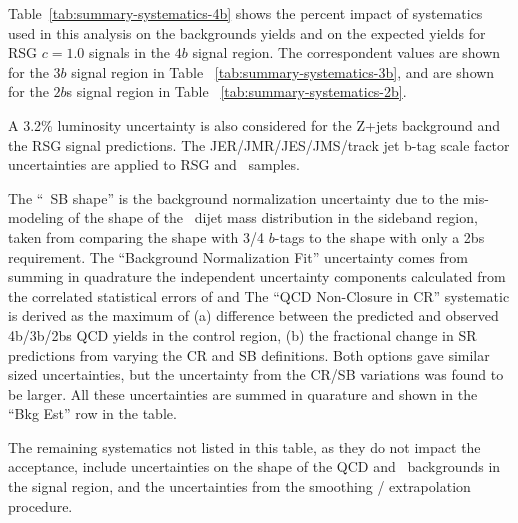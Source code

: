Table~\ref{tab:summary-systematics-4b} shows the percent impact of systematics used in this analysis on the backgrounds yields and on the expected yields for RSG $c=1.0$ signals in the $4b$ signal region. The correspondent values are shown for the $3b$ signal region in Table ~\ref{tab:summary-systematics-3b}, and are shown for the $2b$s signal region in Table ~\ref{tab:summary-systematics-2b}. 

A 3.2\% luminosity uncertainty is also considered for the Z+jets background and the RSG signal predictions. The JER/JMR/JES/JMS/track jet b-tag scale factor uncertainties are applied to RSG and \ttbar\ samples. 

The ``\ttbar\ SB shape'' is the background normalization uncertainty due to the mis-modeling of the 
shape of the \ttbar\ dijet mass distribution in the sideband region, taken from comparing the shape with 3/4 $b$-tags to the shape with only a 2bs requirement. The ``Background Normalization Fit'' uncertainty comes from summing in quadrature the independent uncertainty components calculated from the correlated statistical errors of \muqcd and \alphatt  The ``QCD Non-Closure in CR'' systematic is derived as the maximum of (a) difference between the predicted and observed 4b/3b/2bs QCD yields in the control region, (b) the fractional change in SR predictions from varying the CR and SB definitions.  Both options gave similar sized uncertainties, but the uncertainty from the CR/SB variations was found to be larger. All these uncertainties are summed in quarature and shown in the ``Bkg Est'' row in the table.

The remaining systematics not listed in this table, as they do not impact the acceptance, include uncertainties on the shape of the QCD and \ttbar\ backgrounds in the signal region, and the uncertainties from the smoothing / extrapolation procedure.

